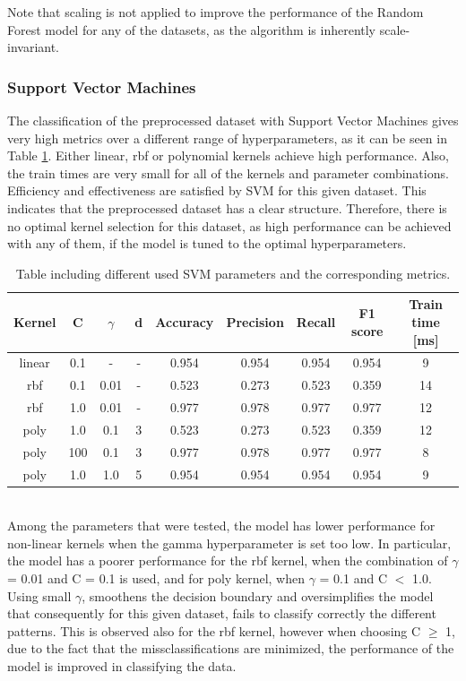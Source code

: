 \documentclass{article}
\begin{document}
Note that scaling is not applied to improve the performance of the Random Forest model for any of the datasets, as the algorithm is inherently scale-invariant.

\subsubsection*{Support Vector Machines}
The classification of the preprocessed dataset with Support Vector Machines gives very high metrics over a different range of hyperparameters, as it can be seen in Table \ref{table:votings_SVM}. Either linear, rbf or polynomial kernels achieve high performance. Also, the train times are very small for all of the kernels and parameter combinations. Efficiency and effectiveness are satisfied by SVM for this given dataset. This indicates that the preprocessed dataset has a clear structure. Therefore, there is no optimal kernel selection for this dataset, as high performance can be achieved with any of them, if the model is tuned to the optimal hyperparameters.
\begin{table}[h!]
\centering
\begin{tabular}{||c c c c c c c c c||} 
 \hline
 Kernel & C & $\gamma$ &d & Accuracy & Precision & Recall & F1 score & Train time [ms] \\ [0.5ex] 
 \hline\hline
 linear & 0.1 & - & - & 0.954 & 0.954 & 0.954 & 0.954 & 9 \\  
 rbf & 0.1 & 0.01 & - & 0.523 & 0.273 & 0.523 & 0.359 & 14 \\
 rbf & 1.0 & 0.01 & - & 0.977 & 0.978 & 0.977 & 0.977 & 12\\
 poly & 1.0 &  0.1 & 3 & 0.523 & 0.273 & 0.523 & 0.359 & 12 \\
 poly & 100 &  0.1 & 3 & 0.977 & 0.978 & 0.977 & 0.977 & 8 \\
 poly &  1.0&  1.0 & 5& 0.954 & 0.954 & 0.954 & 0.954 & 9 \\ [1ex] 
 \hline
\end{tabular}
\caption{Table including different used SVM parameters and the corresponding metrics.}
\label{table:votings_SVM}
\end{table}
\\
Among the parameters that were tested, the model has lower performance for non-linear kernels when the gamma hyperparameter is set too low. In particular, the model has a poorer performance for the rbf kernel, when the combination of $\gamma$ = 0.01 and C = 0.1 is used, and for poly kernel, when $\gamma$ = 0.1 and C $<$ 1.0. Using small $\gamma$, smoothens the decision boundary and oversimplifies the model that consequently for this given dataset, fails to classify correctly the different patterns. This is observed also for the rbf kernel, however when choosing C $\ge$ 1, due to the fact that the missclassifications are minimized, the performance of the model is improved in classifying the data. 
\end{document}
